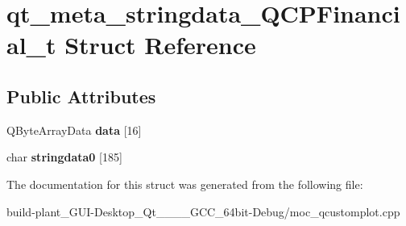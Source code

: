 \hypertarget{structqt__meta__stringdata__QCPFinancial__t}{}\section{qt\+\_\+meta\+\_\+stringdata\+\_\+\+Q\+C\+P\+Financial\+\_\+t Struct Reference}
\label{structqt__meta__stringdata__QCPFinancial__t}
\subsection*{Public Attributes}
\begin{DoxyCompactItemize}
\item 
\mbox{\label{structqt__meta__stringdata__QCPFinancial__t_a32be9c8341c33d8c6da741702c103986}} 
Q\+Byte\+Array\+Data {\bfseries data} \mbox{[}16\mbox{]}
\item 
\mbox{\label{structqt__meta__stringdata__QCPFinancial__t_ad8ba9429514fbfd381c387ad7d4fd8c5}} 
char {\bfseries stringdata0} \mbox{[}185\mbox{]}
\end{DoxyCompactItemize}


The documentation for this struct was generated from the following file\+:\begin{DoxyCompactItemize}
\item 
build-\/plant\+\_\+\+G\+U\+I-\/\+Desktop\+\_\+\+Qt\+\_\+\_\+\_\+\_\+\+G\+C\+C\+\_\+64bit-\/\+Debug/moc\+\_\+qcustomplot.\+cpp\end{DoxyCompactItemize}
